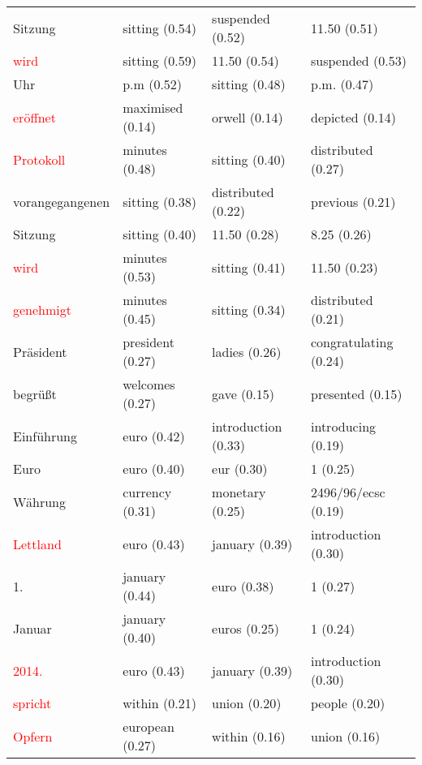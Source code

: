 \documentclass[11pt,twoside,openright]{mpreport}
\begin{document}
\hspace{-4cm}\begin{scriptsize}\begin{tabular}{|llll|}
\hline
Sitzung                 & sitting (0.54) & suspended (0.52) & 11.50 (0.51) \\ %
\textcolor{red}{wird}                    & sitting (0.59) & 11.50 (0.54) & suspended (0.53) \\
Uhr                     & p.m (0.52) & sitting (0.48) & p.m. (0.47) \\ %
\textcolor{red}{eröffnet}               & maximised (0.14) & orwell (0.14) & depicted (0.14) \\
\textcolor{red}{Protokoll}               & minutes (0.48) & sitting (0.40) & distributed (0.27) \\
vorangegangenen         & sitting (0.38) & distributed (0.22) & previous (0.21) \\ %
Sitzung                 & sitting (0.40) & 11.50 (0.28) & 8.25 (0.26) \\ %
\textcolor{red}{wird}                    & minutes (0.53) & sitting (0.41) & 11.50 (0.23) \\
\textcolor{red}{genehmigt}               & minutes (0.45) & sitting (0.34) & distributed (0.21) \\
Präsident              & president (0.27) & ladies (0.26) & congratulating (0.24) \\ %
begrüßt               & welcomes (0.27) & gave (0.15) & presented (0.15) \\ %
Einführung             & euro (0.42) & introduction (0.33) & introducing (0.19) \\ %
Euro                    & euro (0.40) & eur (0.30) & 1 (0.25) \\ %
Währung                & currency (0.31) & monetary (0.25) & 2496/96/ecsc (0.19) \\ %
\textcolor{red}{Lettland}                & euro (0.43) & january (0.39) & introduction (0.30) \\
1.                      & january (0.44) & euro (0.38) & 1 (0.27) \\ %
Januar                  & january (0.40) & euros (0.25) & 1 (0.24) \\ %
\textcolor{red}{2014.}                   & euro (0.43) & january (0.39) & introduction (0.30) \\
\textcolor{red}{spricht}                 & within (0.21) & union (0.20) & people (0.20) \\
\textcolor{red}{Opfern}                  & european (0.27) & within (0.16) & union (0.16) \\

\end{tabular}
\end{scriptsize}
\end{document}
